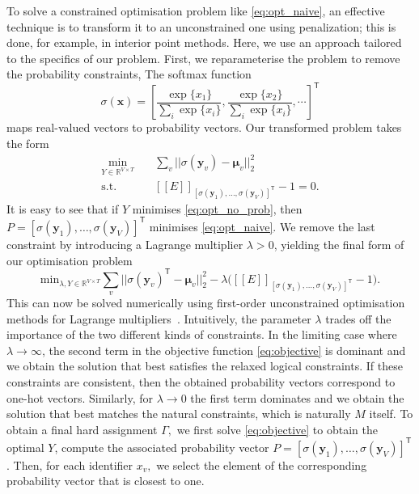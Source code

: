 \documentclass[acmsmall, review, anonymous]{acmart}\settopmatter{printfolios=true,printccs=false,printacmref=false}
\newcommand{\qqpi}[2]{[\![#2]\!]_{#1}}
\begin{document}
To solve a constrained optimisation problem like \autoref{eq:opt_naive}, an effective technique is to transform it to an unconstrained one using penalization; this is done, for example, in interior point methods.
Here, we use an approach tailored to the specifics of our problem.
First, we reparameterise the problem to remove the probability constraints,
The softmax function
\begin{equation}\label{eq:softmax}
	\sigma(\bm{x}) = \left[\frac{\exp\{x_1\}}{\sum_i \exp\{x_i\}}, \frac{\exp\{x_2\}}{\sum_i \exp\{x_i\}}, \cdots \right]^\mathsf{T}
\end{equation}
maps real-valued vectors to probability vectors.
Our transformed problem takes the form
\begin{equation}
	\begin{aligned}\label{eq:opt_no_prob}
		\underset{Y \in \mathbb{R}^{V \times T}}{\mathrm{min}} & \quad
		\sum_v || \sigma(\bm{y}_v) - \bm{\mu}_v ||_2^2                                                                         \\
		\text{s.t. } & \quad
		\qqpi{[\sigma(\bm{y}_1), \ldots, \sigma(\bm{y}_{V})]^\mathsf{T}}{E} -1 = 0.
	\end{aligned}
\end{equation}
It is easy to see that if $Y$ minimises \eqref{eq:opt_no_prob}, then
$P = [\sigma(\bm{y}_1), \ldots, \allowbreak \sigma(\bm{y}_{V})]^\mathsf{T}$
minimises \eqref{eq:opt_naive}.
% 
We remove the last constraint by introducing a Lagrange multiplier $\lambda > 0$, 
yielding the final form of our optimisation problem
\begin{equation}\label{eq:objective}
	\textstyle\mathrm{min}_{\lambda, Y \in \mathbb{R}^{V \times T } }
	\sum_v || \sigma(\bm{y}_v)^\mathsf{T} - \bm{\mu}_v ||_2^2
	- \lambda \big(\qqpi{[\sigma(\bm{y}_1), \ldots, \sigma(\bm{y}_{V})]^\mathsf{T}}{E} - 1\big).
\end{equation}
This can now be solved numerically using first-order unconstrained optimisation methods for Lagrange
multipliers~\citep{bertsekas82}. 
Intuitively, the parameter $\lambda$ trades off the importance
of the two different kinds of constraints.
In the limiting case where $\lambda \rightarrow \infty$, the second term in the objective function \eqref{eq:objective} is dominant and we obtain the solution that best satisfies the relaxed
logical constraints.
If these constraints are consistent, then the obtained probability vectors correspond to one-hot vectors.
Similarly, for $\lambda \rightarrow 0$ the first term dominates and we obtain the solution that best matches the natural constraints,
which is naturally $M$ itself. 
To obtain a final hard assignment $\Gamma,$ we first solve \eqref{eq:objective} to obtain the optimal $Y$, compute the
associated probability vector $P = [\sigma(\bm{y}_1), \ldots, \sigma(\bm{y}_{V})]^\mathsf{T}$. Then, for each identifier $x_v,$
we select the element of the
corresponding probability vector that is closest to one.
\end{document}
